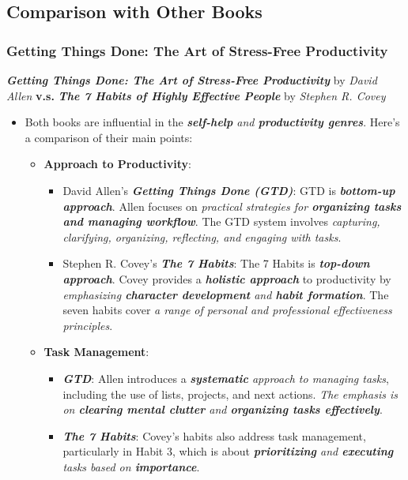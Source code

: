 \documentclass[11pt]{article}
\begin{document}
\subsection{Comparison with Other Books}
\subsubsection{Getting Things Done: The Art of Stress-Free Productivity}
\emph{\textbf{Getting Things Done: The Art of Stress-Free Productivity}} by \emph{David Allen} \textbf{v.s.} \emph{\textbf{The 7 Habits of Highly Effective People}} by \emph{Stephen R. Covey}
\begin{itemize}
\item Both books are influential in the \emph{\textbf{self-help} and \textbf{productivity genres}}. Here's a comparison of their main points:

\begin{itemize}
\item \textbf{Approach to Productivity}:
\begin{itemize}
\item David Allen's \emph{\textbf{Getting Things Done (GTD)}}: GTD is \emph{\textbf{bottom-up approach}}. Allen focuses on \emph{practical strategies for \textbf{organizing tasks and managing workflow}}. The GTD system involves \emph{capturing, clarifying, organizing, reflecting, and engaging with tasks}.
\item Stephen R. Covey's \emph{\textbf{The 7 Habits}}: The 7 Habits is \emph{\textbf{top-down approach}}. Covey provides a \emph{\textbf{holistic approach}} to productivity by \emph{emphasizing \textbf{character development} and \textbf{habit formation}}. The seven habits cover \emph{a range of personal and professional effectiveness principles}.
\end{itemize}

\item \textbf{Task Management}:
\begin{itemize}
\item \emph{\textbf{GTD}}: Allen introduces a \emph{\textbf{systematic} approach to managing tasks}, including the use of lists, projects, and next actions. \emph{The emphasis is on \textbf{clearing mental clutter} and \textbf{organizing tasks effectively}}. 

\item \emph{\textbf{The 7 Habits}}: Covey's habits also address task management, particularly in Habit 3, which is about \emph{\textbf{prioritizing} and \textbf{executing} tasks based on \textbf{importance}}. 
\end{itemize}


\end{itemize}
\end{itemize}
\end{document}
